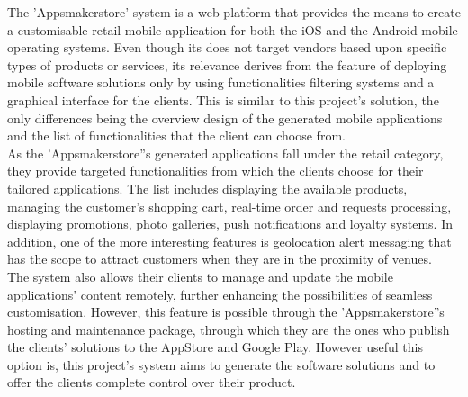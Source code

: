 The 'Appsmakerstore'\cite{appsmakerstore} system is a web platform that provides the means to create a customisable retail mobile application for both the iOS and the Android mobile operating systems. Even though its does not target vendors based upon specific types of products or services, its relevance derives from the feature of deploying mobile software solutions only by using functionalities filtering systems and a graphical interface for the clients. This is similar to this project's solution, the only differences being the overview design of the generated mobile applications and the list of functionalities that the client can choose from.\\

As the 'Appsmakerstore''s generated applications fall under the retail category, they provide targeted functionalities from which the clients choose for their tailored applications. The list includes displaying the available products, managing the customer's shopping cart, real-time order and requests processing, displaying promotions, photo galleries, push notifications and loyalty systems. In addition, one of the more interesting features is geolocation alert messaging that has the scope to attract customers when they are in the proximity of venues.\\

The system also allows their clients to manage and update the mobile applications' content remotely, further enhancing the possibilities of seamless customisation. However, this feature is possible through the 'Appsmakerstore''s hosting and maintenance package, through which they are the ones who publish the clients' solutions to the AppStore and Google Play. However useful this option is, this project's system aims to generate the software solutions and to offer the clients complete control over their product.